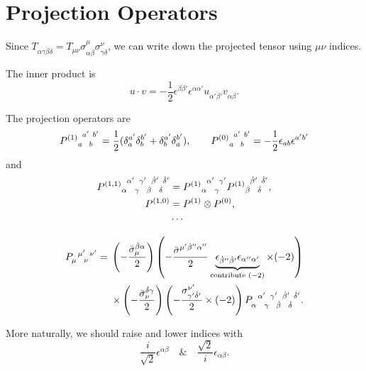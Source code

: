 \section{Projection Operators}
Since $T_{\alpha \gamma \dot\beta \dot\delta} = T_{\mu \nu} \sigma^\mu_{\alpha \dot\beta} \sigma^\nu_{\gamma \dot\delta}$, we can write down the projected tensor using $\mu \nu$ indices.
\begin{framed}
    The inner product is
    \begin{equation}
        u \cdot v = - \frac{1}{2} \epsilon^{\dot\beta \dot\beta'} \epsilon^{\alpha \alpha'} u_{\alpha' \dot\beta'} v_{\alpha \dot\beta}.
    \end{equation}
\end{framed}
The projection operators are
\begin{equation}
    \tensor{{P^{(1)}}}{_a^{a'}_b^{b'}} = \frac{1}{2} (\delta_a^{a'} \delta_b^{b'} + \delta_b^{a'} \delta_a^{b'}), \qquad \tensor{{P^{(0)}}}{_a^{a'}_b^{b'}} = - \frac{1}{2} \epsilon_{a b} \epsilon^{a' b'}
\end{equation}
and
\begin{align}
    \tensor{{P^{(1, 1)}}}{_\alpha^{\alpha'}_\gamma^{\gamma'}_{\dot\beta}^{\dot\beta'}_{\dot\delta}^{\dot\delta'}} & = \tensor{{P^{(1)}}}{_\alpha^{\alpha'}_\gamma^{\gamma'}} \tensor{{P^{(1)}}}{_{\dot\beta}^{\dot\beta'}_{\dot\delta}^{\dot\delta'}}, \notag \\
    P^{(1, 0)} & = P^{(1)} \otimes P^{(0)}, \notag \\
    & \cdots
\end{align}
\begin{framed}
    \begin{align}
        \tensor{P}{_\mu^{\mu'}_\nu^{\nu'}} = {} & \left(- \frac{\bar\sigma_\mu^{\dot\beta \alpha}}{2} \right) \left(- \frac{\bar\sigma^{\mu' \dot\beta'' \alpha''}}{2} \underbrace{\epsilon_{\dot\beta'' \dot\beta'} \epsilon_{\alpha'' \alpha'}}_{\text{contribute } (- 2)} \times (- 2) \right) \notag \\
        & \times \left(- \frac{\bar\sigma_\nu^{\dot\delta \gamma}}{2} \right) \left(- \frac{\sigma^{\nu'}_{\gamma' \dot\delta'}}{2} \times (- 2) \right) \tensor{P}{_\alpha^{\alpha'}_\gamma^{\gamma'}_{\dot\beta}^{\dot\beta'}_{\dot\delta}^{\dot\delta'}}.
    \end{align}
\end{framed}
\begin{framed}
    More naturally, we should raise and lower indices with
    \begin{equation}
        \frac{i}{\sqrt{2}} \epsilon^{\alpha \beta} \quad \& \quad \frac{\sqrt{2}}{i} \epsilon_{\alpha \beta}.
    \end{equation}
\end{framed}
